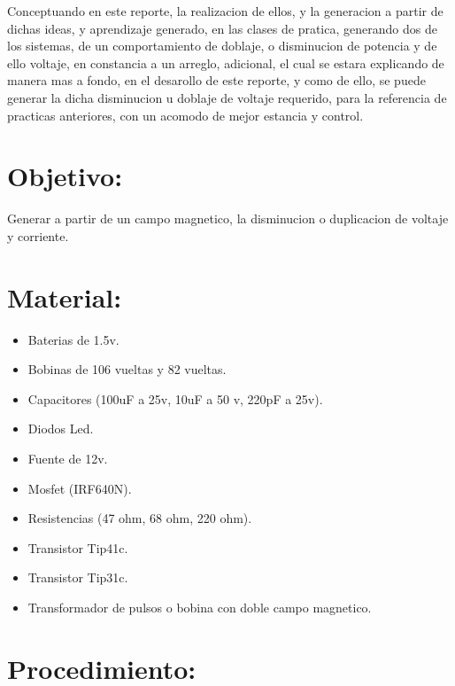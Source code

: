 \documentclass[11pt]{article}
\begin{document}
Conceptuando en este reporte, la realizacion de ellos, y la generacion a partir de dichas ideas, y aprendizaje generado, en las clases de pratica, generando dos de los sistemas, de un comportamiento de doblaje, o disminucion de potencia y de ello voltaje, en constancia a un arreglo, adicional, el cual se estara explicando de manera mas a fondo, en el desarollo de este reporte, y como de ello, se puede generar la dicha disminucion u doblaje de voltaje requerido, para la referencia de practicas anteriores, con un acomodo de mejor estancia y control. 


\section{Objetivo:}

Generar a partir de un campo magnetico, la disminucion o duplicacion de voltaje y corriente.

\section{Material:}

\begin{itemize}
\item Baterias de 1.5v.
\item Bobinas de 106 vueltas y 82 vueltas.
\item Capacitores (100uF a 25v, 10uF a 50 v, 220pF a 25v).
\item Diodos Led.
\item Fuente de 12v.
\item Mosfet (IRF640N).
\item Resistencias (47 ohm, 68 ohm, 220 ohm).
\item Transistor Tip41c.
\item Transistor Tip31c.
\item Transformador de pulsos o bobina con doble campo magnetico.
\end{itemize}
\newpage
\section{Procedimiento:}
\end{document}
